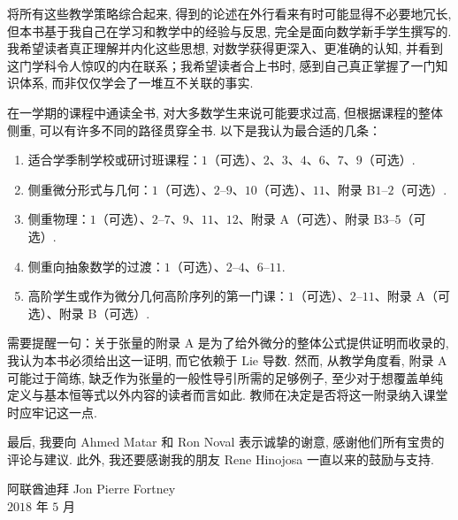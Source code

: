 \documentclass[
    BookTitleCN={微分形式与流形上的微积分：可视化导引},
    BookTitleEN={A Visual Introduction to Differential Forms and Calculus on Manifolds},
    OriginalAuthor={Jon Pierre Fortney},
    OriginalEdition={Birkhäuser},
    OriginalPublisher={Springer Nature},
    OriginalYear={2018},
    Translator={Fingolfin},
    ModelUsed={Qwen-Code},
    BibStyle=numeric
]{mathtranslation}
\theoremstyle{mtsong}
\begin{document}
将所有这些教学策略综合起来, 得到的论述在外行看来有时可能显得不必要地冗长, 但本书基于我自己在学习和教学中的经验与反思, 完全是面向数学新手学生撰写的. 我希望读者真正理解并内化这些思想, 对数学获得更深入、更准确的认知, 并看到这门学科令人惊叹的内在联系；我希望读者合上书时, 感到自己真正掌握了一门知识体系, 而非仅仅学会了一堆互不关联的事实.

在一学期的课程中通读全书, 对大多数学生来说可能要求过高, 但根据课程的整体侧重, 可以有许多不同的路径贯穿全书. 以下是我认为最合适的几条：

\begin{enumerate}
  \item 适合学季制学校或研讨班课程：$1$（可选）、$2$、$3$、$4$、$6$、$7$、$9$（可选）.
  \item 侧重微分形式与几何：$1$（可选）、$2$--$9$、$10$（可选）、$11$、附录 B$1$--$2$（可选）.
  \item 侧重物理：$1$（可选）、$2$--$7$、$9$、$11$、$12$、附录 A（可选）、附录 B$3$--$5$（可选）.
  \item 侧重向抽象数学的过渡：$1$（可选）、$2$--$4$、$6$--$11$.
  \item 高阶学生或作为微分几何高阶序列的第一门课：$1$（可选）、$2$--$11$、附录 A（可选）、附录 B（可选）.
\end{enumerate}

需要提醒一句：关于张量的附录 A 是为了给外微分的整体公式提供证明而收录的, 我认为本书必须给出这一证明, 而它依赖于 Lie 导数. 然而, 从教学角度看, 附录 A 可能过于简练, 缺乏作为张量的一般性导引所需的足够例子, 至少对于想覆盖单纯定义与基本恒等式以外内容的读者而言如此. 教师在决定是否将这一附录纳入课堂时应牢记这一点.

最后, 我要向 Ahmed Matar 和 Ron Noval 表示诚挚的谢意, 感谢他们所有宝贵的评论与建议. 此外, 我还要感谢我的朋友 Rene Hinojosa 一直以来的鼓励与支持.

\begin{flushright}
阿联酋迪拜 \hfill Jon Pierre Fortney\\
$2018$ 年 $5$ 月
\end{flushright}

\vspace{2cm}

\mainmatter














\appendix




\makebibliography

\printterminology
\end{document}
